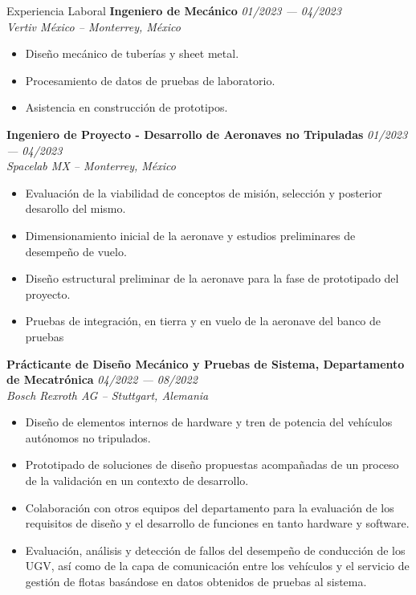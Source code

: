 \documentclass[letterpaper]{resume} %
\begin{document}
    \begin{rSection}{Experiencia Laboral}
        {\bf Ingeniero de Mecánico} \hfill{\itshape 01/2023 --- 04/2023} 
        \\{\textit{Vertiv México -- Monterrey, México}}
        \begin{itemize}
            \item Diseño mecánico de tuberías y sheet metal.
            \item Procesamiento de datos de pruebas de laboratorio.
            \item Asistencia en construcción de prototipos.
        \end{itemize}
        
        {\bf Ingeniero de Proyecto - Desarrollo de Aeronaves no Tripuladas} \hfill{\itshape 01/2023 --- 04/2023} 
        \\{\textit{Spacelab MX -- Monterrey, México}}
        \begin{itemize}
            \item Evaluación de la viabilidad de conceptos de misión, selección y posterior desarollo del mismo.
            \item Dimensionamiento inicial de la aeronave y estudios preliminares de desempeño de vuelo.
            \item Diseño estructural preliminar de la aeronave para la fase de prototipado del proyecto.
            \item Pruebas de integración, en tierra y en vuelo de la aeronave del banco de pruebas
        \end{itemize}
    
        {\bf Prácticante de Diseño Mecánico y Pruebas de Sistema, Departamento de Mecatrónica} \hfill{\itshape 04/2022 --- 08/2022} 
        \\{\textit{Bosch Rexroth AG -- Stuttgart, Alemania}}
        \begin{itemize}
            \item Diseño de elementos internos de hardware y tren de potencia del vehículos autónomos no tripulados.
            \item Prototipado de soluciones de diseño propuestas acompañadas de un proceso de la validación en un contexto de desarrollo.
            \item Colaboración con otros equipos del departamento para la evaluación de los requisitos de diseño y el desarrollo de funciones en tanto hardware y software.
            \item Evaluación, análisis y detección de fallos del desempeño de conducción de los UGV, así como de la capa de comunicación entre los vehículos y el servicio de gestión de flotas basándose en datos obtenidos de pruebas al sistema.
        \end{itemize}
    \end{rSection}
    
\end{document}
